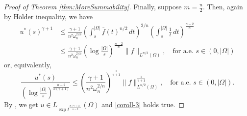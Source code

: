 \documentclass[11pt,a4paper]{amsart}
\theoremstyle{definition}
\theoremstyle{plain}
\numberwithin{equation}{section}
\begin{document}
{\begin{proof}[Proof of Theorem \ref{thm:MoreSummability}]
Finally, suppose $m=\frac{n}{2}$. Then, again by H\"older inequality, we have
$$
\begin{aligned}
	u^{*}(s)^{\gamma+1} & \leq \frac{\gamma+1}{n^{2} \omega_{n}^{2 / n}}\left(\int_{s}^{|\Omega|} \bar{f}(t)^{n / 2} \, d t\right)^{2 / n}\left(\int_{s}^{|\Omega|} \frac{1}{t} \, d t\right)^{\frac{n-2}{n}} \\
	& \leq \frac{\gamma+1}{n^{2} \omega_{n}^{2 / n}}\left(\log \frac{|\Omega|}{s}\right)^{\frac{n-2}{n}}\|f\|_{L^{n / 2}(\Omega)}, \quad \text{for a.e. }s \in(0,|\Omega|)
\end{aligned}
$$
or, equivalently,
$$
\frac{u^{*}(s)}{\left(\log \frac{|\Omega|}{s}\right)^{\frac{n-2}{n(\gamma+1)}}} \leq\left(\frac{\gamma+1}{n^{2} \omega_{n}^{2 / n}}\right)^{\frac{1}{\gamma+1}}\|f\|_{L^{n / 2}(\Omega)}^{\frac{1}{\gamma+1}}, \quad \text{for a.e. }s \in(0,|\Omega|) .
$$
By \cite[Proposition 2.2]{BCT}, we get $u \in L_{\exp t^{\frac{n(\gamma+1)}{n-2}}}(\Omega)$ and \eqref{coroll-3} holds true. 
\end{proof}


























  
  
\appendix
}
\end{document}
